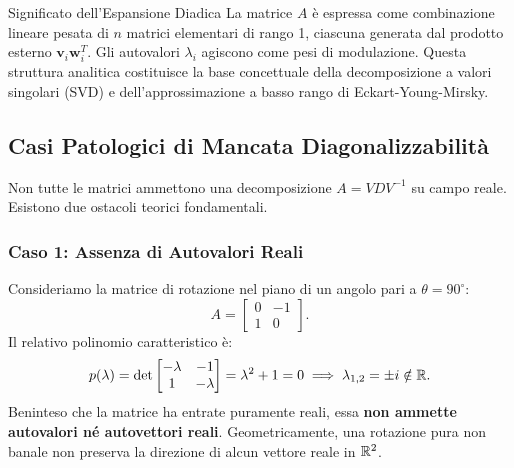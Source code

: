 \begin{noteblock}{Significato dell'Espansione Diadica}
La matrice $A$ \`e espressa come combinazione lineare pesata di $n$ matrici elementari di rango 1, ciascuna generata dal prodotto esterno $\mathbf{v}_i \mathbf{w}_i^T$. Gli autovalori $\lambda_i$ agiscono come pesi di modulazione. Questa struttura analitica costituisce la base concettuale della decomposizione a valori singolari (SVD) e dell'approssimazione a basso rango di Eckart-Young-Mirsky.
\end{noteblock}

\subsection{Casi Patologici di Mancata Diagonalizzabilit\`a}

Non tutte le matrici ammettono una decomposizione $A = V D V^{-1}$ su campo reale. Esistono due ostacoli teorici fondamentali.

\subsubsection{Caso 1: Assenza di Autovalori Reali}
Consideriamo la matrice di rotazione nel piano di un angolo pari a $\theta = 90^\circ$:
\begin{equation}
    A = \begin{bmatrix} 0 & -1 \\ 1 & 0 \end{bmatrix}.
\end{equation}
Il relativo polinomio caratteristico \`e:
\begin{equation}
    p(\lambda) = \det \begin{bmatrix} -\lambda & -1 \\ 1 & -\lambda \end{bmatrix} = \lambda^2 + 1 = 0 \implies \lambda_{1,2} = \pm i \notin \mathbb{R}.
\end{equation}
Beninteso che la matrice ha entrate puramente reali, essa \textbf{non ammette autovalori n\'e autovettori reali}. Geometricamente, una rotazione pura non banale non preserva la direzione di alcun vettore reale in $\mathbb{R}^2$.

